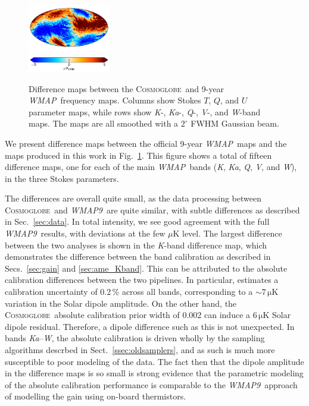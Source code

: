 \documentclass[twocolumn]{../../common/aa}
\def\WMAP{\emph{WMAP}}
\def\WMAPnine{\emph{WMAP9}}
\newcommand{\cosmoglobe}{\textsc{Cosmoglobe}}
\newcommand{\K}[0]{\textit K}
\newcommand{\Ka}[0]{\textit{Ka}}
\newcommand{\Q}[0]{\textit Q}
\newcommand{\V}[0]{\textit V}
\newcommand{\W}[0]{\textit W}
\begin{document}
\begin{figure}
        \includegraphics[width=0.32\textwidth]{figures/megadiff_W_U.pdf}\\\vspace*{-4mm}
	\includegraphics[width=0.32\textwidth]{figures/cbar_5uK_cmb.pdf}
	\caption{Difference maps between the \cosmoglobe\ and 9-year \WMAP\ frequency maps. Columns show Stokes $T$, $Q$, and $U$ parameter maps, while rows show \K-, \Ka-, \Q-, \V-, and \W-band maps. The maps are all smoothed with a $2^\circ$ FWHM Gaussian beam.}
        \label{fig:megadiff_wmap}
\end{figure}

We present difference maps between the official 9-year \WMAP\ maps and the maps produced in this work in Fig.~\ref{fig:megadiff_wmap}. This figure shows a total of fifteen difference maps, one for each of the main \WMAP\ bands (\K, \Ka, \Q, \V, and \W), in the three Stokes parameters. 

The differences are overall quite small, as the data processing between \cosmoglobe\ and \WMAPnine\ are quite similar, with subtle differences as described in Sec.~\ref{sec:data}. In total intensity, we see good agreement with the full \WMAPnine\ results, with deviations at the few $\mu\mathrm{K}$ level. The largest difference between the two analyses is shown in the \K-band difference map, which demonstrates the difference between the band calibration as described in Secs.~\ref{sec:gain} and \ref{sec:ame_Kband}.
This can be attributed to the absolute calibration differences between the two pipelines. In particular, \citet{bennett2012} estimates a calibration uncertainty of 0.2\,\% across all bands, corresponding to a $\sim7\,\mathrm{\mu K}$ variation in the Solar dipole amplitude.
On the other hand, the  \cosmoglobe\ absolute calibration prior width of 0.002 can induce a $6\,\mathrm{\mu K}$ Solar dipole residual. Therefore, a dipole difference such as this is not unexpected.
In bands \Ka--\W, the absolute calibration is driven wholly by the sampling algorithms descrbed in Sect.~\ref{ssec:oldsamplers}, and as such is much more susceptible to poor modeling of the data. The fact then that the dipole amplitude in the difference maps is so small is strong evidence that the parametric modeling of the absolute calibration performance is comparable to the \WMAPnine\ approach of modelling the gain using on-board thermistors.
\end{document}
